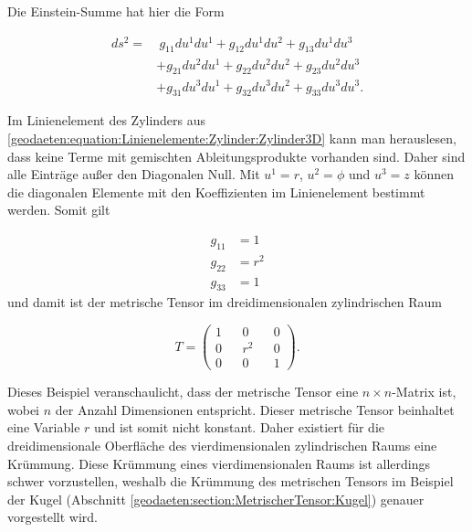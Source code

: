 Die Einstein-Summe hat hier die Form

\begin{equation}
\begin{aligned}
	ds^2 = &\ g_{11}  du^1  du^1 + g_{12}  du^1  du^2 + g_{13}  du^1  du^3 \nonumber \\
	&+ g_{21}  du^2  du^1 + g_{22}  du^2  du^2 + g_{23}  du^2  du^3 \nonumber \\
	&+ g_{31}  du^3  du^1 + g_{32}  du^3  du^2 + g_{33}  du^3  du^3  .
\end{aligned} 
	\label{geodaeten:equation:MetrischerTensor:Kartesisch:EinsteinSumme3D}
\end{equation}

Im Linienelement des Zylinders aus \eqref{geodaeten:equation:Linienelemente:Zylinder:Zylinder3D} kann man herauslesen, dass keine Terme mit gemischten Ableitungsprodukte vorhanden sind.
Daher sind alle Einträge außer den Diagonalen Null.
Mit $u^1 = r$, $u^2 = \phi$ und $u^3 = z$  können die diagonalen Elemente mit den Koeffizienten im Linienelement bestimmt werden. 
Somit gilt

\begin{equation}
	\begin{aligned}
		g_{11}  &= 1  \\
		g_{22}  &= r^2 \\
		g_{33}  &= 1  
	\end{aligned}
\end{equation}
und damit ist der metrische Tensor im dreidimensionalen zylindrischen Raum

\begin{equation}
	T = \begin{pmatrix} 1 && 0 && 0 \\ 0 && r^2 && 0 \\ 0 && 0 && 1 \end{pmatrix} .
\end{equation}

Dieses Beispiel veranschaulicht, dass der metrische Tensor eine $n \times n$-Matrix ist, wobei $n$ der Anzahl Dimensionen entspricht.
Dieser metrische Tensor beinhaltet eine Variable $r$ und ist somit nicht konstant. 
Daher existiert für die dreidimensionale Oberfläche des vierdimensionalen zylindrischen Raums eine Krümmung.
Diese Krümmung eines vierdimensionalen Raums ist allerdings schwer vorzustellen, weshalb die Krümmung des metrischen Tensors im Beispiel der Kugel (Abschnitt \ref{geodaeten:section:MetrischerTensor:Kugel}) genauer vorgestellt wird.
